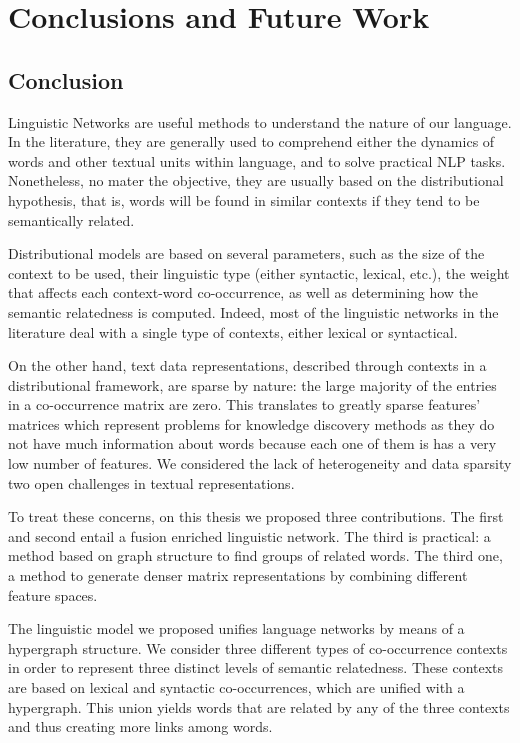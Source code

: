 \chapter{Conclusions and Future Work}
\label{chap:conclusions}
\section{Conclusion}
Linguistic Networks are useful methods to understand the nature of our language. In the literature, they are generally used to comprehend either the dynamics of words and other textual units within language, and to solve practical NLP tasks. Nonetheless, no mater the objective, they are usually based on the distributional hypothesis, that is, words will be found in similar contexts if they tend to be semantically related.

Distributional models are based on several parameters, such as the size of the context to be used, their linguistic type (either syntactic, lexical, etc.), the weight that affects each context-word co-occurrence, as well as determining how the semantic relatedness is computed. Indeed, most of the linguistic networks in the literature deal with a single type of contexts, either lexical or syntactical.

On the other hand, text data representations, described through contexts in a distributional framework, are sparse by nature: the large majority of the entries in a co-occurrence matrix are zero. This translates to greatly sparse features' matrices which represent problems for knowledge discovery methods as they do not have much information about words because each one of them is has a very low number of features. We considered the lack of heterogeneity and data sparsity two open challenges in textual representations.

To treat these concerns, on this thesis we proposed three contributions. The first and second entail a fusion enriched linguistic network. The third is practical: a method based on graph structure to find groups of related words. The third one, a method to generate denser matrix representations by combining different feature spaces.

The linguistic model we proposed unifies language networks by means of a hypergraph structure. We consider three different types of co-occurrence contexts in order to represent three distinct levels of semantic relatedness. These contexts are based on lexical and syntactic co-occurrences, which are unified with a hypergraph. This union yields words that are related by any of the three contexts and thus creating more links among words. 

